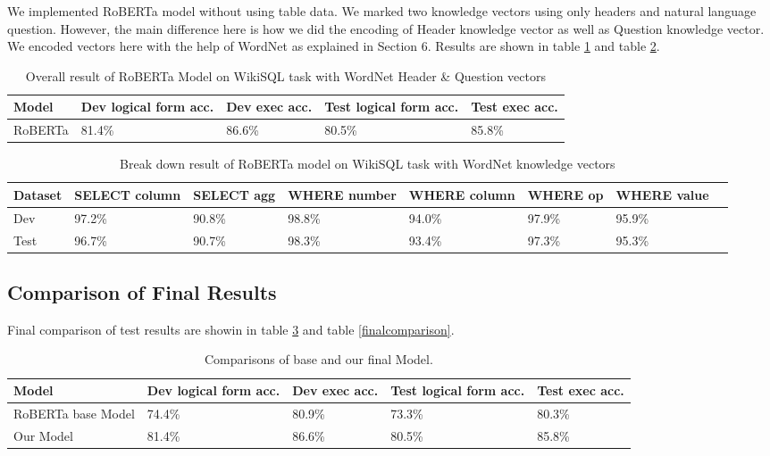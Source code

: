 \documentclass[12pt]{article}
\begin{document}
We implemented RoBERTa model without using table data. We marked two knowledge vectors using only headers and natural language question. However, the main difference here is how we did the  encoding of Header knowledge vector as well as Question knowledge vector. We encoded vectors here with the help of WordNet as explained in Section 6. Results are shown in table \ref{robertatabletwoheader} and table \ref{robertatabledetailedtwoheader}.

 \begin{table}
\centering
 \begin{tabular}{| m{2cm} | m{2cm}| m{2cm} |m{2cm}| m{2cm} |} 
 \hline
Model & Dev logical form acc. & Dev exec acc. & Test logical form acc. & Test exec acc. \\ 
 \hline\hline
  RoBERTa & 81.4\% & 86.6\% & 80.5\% & 85.8\% \\ 
 \hline
\end{tabular}
\caption{Overall result of RoBERTa Model on WikiSQL task with WordNet Header \& Question vectors}
\label{robertatabletwoheader}
\end{table}


\begin{table}
\centering
 \begin{tabular}{| m{2cm} | m{2cm}| m{2cm} |m{2cm}| m{2cm} |m{2cm} | m{2cm} |m{2cm} |} 
 \hline
  Dataset & SELECT column & SELECT agg & WHERE number & WHERE column & WHERE op & WHERE value\\ 
 \hline\hline
  Dev & 97.2\% & 90.8\% & 98.8\% & 94.0\% & 97.9\% &  95.9\% \\ 
\hline
 Test & 96.7\% & 90.7\% & 98.3\% & 93.4\% & 97.3\% &  95.3\% \\ 
 \hline

\end{tabular}
\caption{Break down result of RoBERTa model on WikiSQL task with WordNet knowledge vectors}
\label{robertatabledetailedtwoheader}
\end{table}

\subsection{Comparison of Final Results}
Final comparison of test results are showin in table \ref{finalcomparisonmodel} and table \ref{finalcomparison}.


 \begin{table}
\centering
 \begin{tabular}{| m{2cm} | m{2cm}| m{2cm} |m{2cm}| m{2cm} |} 
 \hline
Model & Dev logical form acc. & Dev exec acc. & Test logical form acc. & Test exec acc. \\ 
 \hline\hline
   RoBERTa base Model & 74.4\% & 80.9\% & 73.3\% & 80.3\% \\ 
  Our Model & 81.4\% & 86.6\% & 80.5\% & 85.8\% \\ 
 \hline
\end{tabular}
\caption{Comparisons of base and our final Model.}
\label{finalcomparisonmodel}
\end{table}
\end{document}
